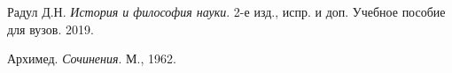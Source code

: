\begin{thebibliography}{9}

Радул Д.Н. 
\textit{История и философия науки}. 2-е изд., испр. и доп. Учебное пособие для вузов. 2019.

Архимед.
\textit{Сочинения}. М., 1962.

\end{thebibliography}
